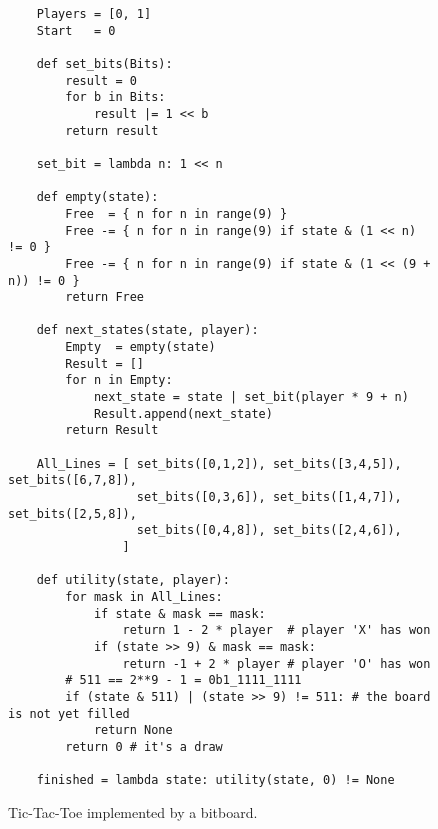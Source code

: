 \begin{figure}[!ht]
\centering
\begin{verbatim}
    Players = [0, 1]
    Start   = 0
    
    def set_bits(Bits):
        result = 0
        for b in Bits:
            result |= 1 << b
        return result

    set_bit = lambda n: 1 << n

    def empty(state):
        Free  = { n for n in range(9) }
        Free -= { n for n in range(9) if state & (1 << n) != 0 }
        Free -= { n for n in range(9) if state & (1 << (9 + n)) != 0 }
        return Free

    def next_states(state, player):
        Empty  = empty(state)
        Result = []
        for n in Empty:
            next_state = state | set_bit(player * 9 + n)
            Result.append(next_state)
        return Result

    All_Lines = [ set_bits([0,1,2]), set_bits([3,4,5]), set_bits([6,7,8]), 
                  set_bits([0,3,6]), set_bits([1,4,7]), set_bits([2,5,8]), 
                  set_bits([0,4,8]), set_bits([2,4,6]), 
                ]

    def utility(state, player):
        for mask in All_Lines:
            if state & mask == mask:
                return 1 - 2 * player  # player 'X' has won
            if (state >> 9) & mask == mask:
                return -1 + 2 * player # player 'O' has won
        # 511 == 2**9 - 1 = 0b1_1111_1111  
        if (state & 511) | (state >> 9) != 511: # the board is not yet filled
            return None
        return 0 # it's a draw
    
    finished = lambda state: utility(state, 0) != None
\end{verbatim}
\vspace*{-0.3cm}
\caption{Tic-Tac-Toe implemented by a bitboard.}
\label{fig:Tic-Tac-Toe-Bitboard.ipynb}
\end{figure}

